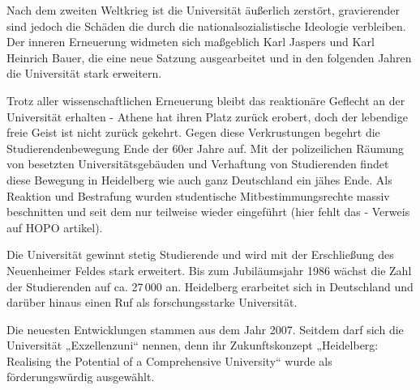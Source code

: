 Nach dem zweiten Weltkrieg ist die Universität äußerlich zerstört, gravierender sind jedoch die Schäden die durch die nationalsozialistische Ideologie verbleiben. Der inneren Erneuerung widmeten sich maßgeblich Karl Jaspers und Karl Heinrich Bauer, die eine 
neue Satzung ausgearbeitet und in den folgenden Jahren die Universität stark erweitern. 

Trotz aller wissenschaftlichen Erneuerung bleibt das reaktionäre Geflecht an der Universität erhalten - Athene hat ihren Platz zurück erobert, doch der lebendige freie Geist ist nicht zurück gekehrt.
Gegen diese Verkrustungen begehrt die Studierendenbewegung Ende der 60er Jahre auf. Mit der polizeilichen Räumung von besetzten Universitätsgebäuden und Verhaftung von Studierenden findet diese Bewegung in Heidelberg wie auch ganz Deutschland ein jähes Ende. Als Reaktion und Bestrafung wurden studentische Mitbestimmungsrechte massiv beschnitten und seit dem nur teilweise wieder eingeführt (hier fehlt das - Verweis auf HOPO artikel).

Die Universität gewinnt stetig Studierende und wird mit der Erschließung des Neuenheimer Feldes stark erweitert. Bis zum Jubiläumsjahr 1986 wächst die Zahl 
der Studierenden auf ca. 27\,000 an. Heidelberg erarbeitet sich in Deutschland und darüber hinaus einen Ruf als forschungsstarke Universität.





Die neuesten Entwicklungen stammen aus dem Jahr 2007. Seitdem darf sich die 
Universität „Exzellenzuni“ nennen, denn ihr Zukunftskonzept „Heidelberg: Realising 
the Potential of a Comprehensive University“ wurde als förderungswürdig ausgewählt. 
